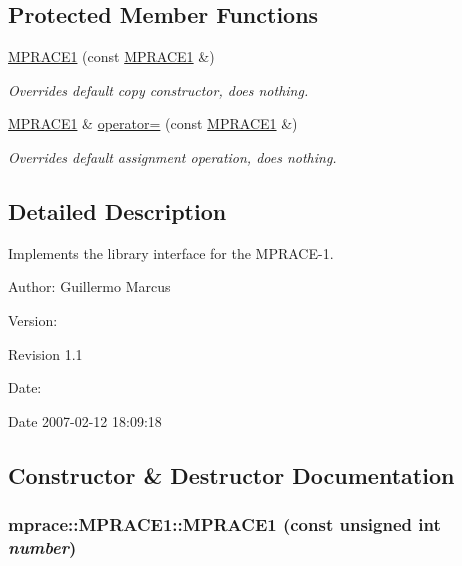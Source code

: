 \subsection*{Protected Member Functions}
\begin{CompactItemize}
\item 
\hyperlink{classmprace_1_1MPRACE1_b0}{MPRACE1} (const \hyperlink{classmprace_1_1MPRACE1}{MPRACE1} \&)
\begin{CompactList}\small\item\em Overrides default copy constructor, does nothing. \item\end{CompactList}\item 
\hyperlink{classmprace_1_1MPRACE1}{MPRACE1} \& \hyperlink{classmprace_1_1MPRACE1_b1}{operator=} (const \hyperlink{classmprace_1_1MPRACE1}{MPRACE1} \&)
\begin{CompactList}\small\item\em Overrides default assignment operation, does nothing. \item\end{CompactList}\end{CompactItemize}


\subsection{Detailed Description}
Implements the library interface for the MPRACE-1. 

\begin{Desc}
\item[Author:]Guillermo Marcus \end{Desc}
\begin{Desc}
\item[Version:]\begin{Desc}
\item[Revision]1.1 \end{Desc}
\end{Desc}
\begin{Desc}
\item[Date:]\begin{Desc}
\item[Date]2007-02-12 18:09:18 \end{Desc}
\end{Desc}




\subsection{Constructor \& Destructor Documentation}
\hypertarget{classmprace_1_1MPRACE1_a0}{
\subsubsection[MPRACE1]{\setlength{\rightskip}{0pt plus 5cm}mprace::MPRACE1::MPRACE1 (const unsigned int {\em number})}}
\label{classmprace_1_1MPRACE1_a0}


